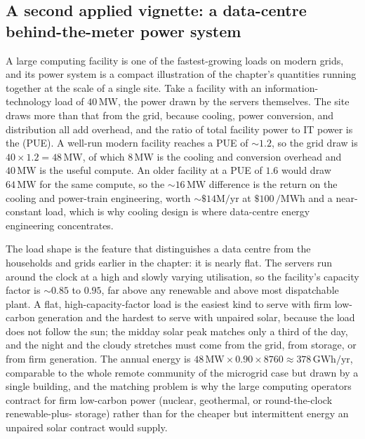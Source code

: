 \subsection{A second applied vignette: a data-centre behind-the-meter power system}

A large computing facility is one of the fastest-growing loads on modern
grids, and its power system is a compact illustration of the chapter's
quantities running together at the scale of a single site. Take a facility
with an information-technology load of $40\,\si{\mega\watt}$, the power drawn
by the servers themselves. The site draws more than that from the grid,
because cooling, power conversion, and distribution all add overhead, and the
ratio of total facility power to IT power is the  (PUE). A well-run modern facility reaches a PUE of $\sim 1.2$,
so the grid draw is $40\times 1.2 = 48\,\si{\mega\watt}$, of which
$8\,\si{\mega\watt}$ is the cooling and conversion overhead and $40\,\si{
\mega\watt}$ is the useful compute. An older facility at a PUE of $1.6$ would
draw $64\,\si{\mega\watt}$ for the same compute, so the $\sim 16\,\si{\mega
\watt}$ difference is the return on the cooling and power-train engineering,
worth $\sim \$14\text{M}/\text{yr}$ at $\$100\,\si{\per\mega\watt\hour}$ and
a near-constant load, which is why cooling design is where data-centre energy
engineering concentrates.

The load shape is the feature that distinguishes a data centre from the
households and grids earlier in the chapter: it is nearly flat. The servers
run around the clock at a high and slowly varying utilisation, so the
facility's capacity factor is $\sim 0.85$ to $0.95$, far above any renewable
and above most dispatchable plant. A flat, high-capacity-factor load is the
easiest kind to serve with firm low-carbon generation and the hardest to
serve with unpaired solar, because the load does not follow the sun; the
midday solar peak matches only a third of the day, and the night and the
cloudy stretches must come from the grid, from storage, or from firm
generation. The annual energy is $48\,\si{\mega\watt}\times 0.90\times 8760
\approx 378\,\si{\giga\watt\hour}/\text{yr}$, comparable to the whole remote
community of the microgrid case but drawn by a single building, and the
matching problem is why the large computing operators contract for firm
low-carbon power (nuclear, geothermal, or round-the-clock renewable-plus-
storage) rather than for the cheaper but intermittent energy an unpaired
solar contract would supply.

